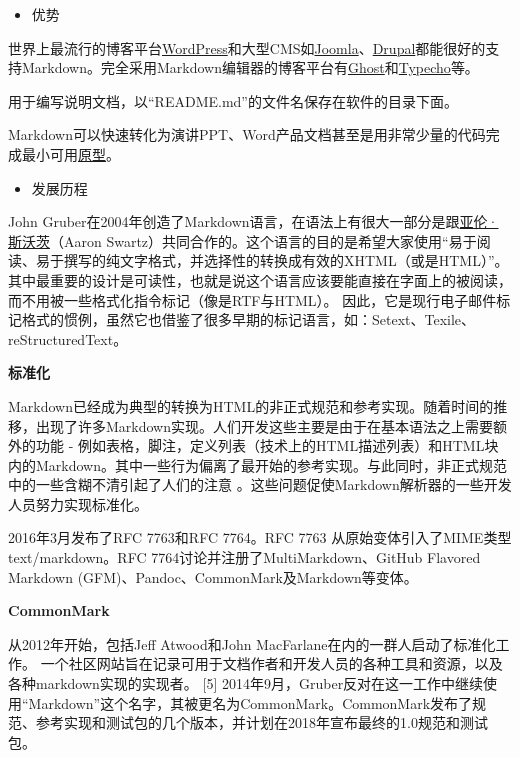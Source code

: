 \documentclass[
]{article}
\begin{document}
\begin{itemize}
\item
  优势
\end{itemize}

世界上最流行的博客平台\href{https://baike.baidu.com/item/WordPress}{WordPress}和大型CMS如\href{https://baike.baidu.com/item/Joomla}{Joomla}、\href{https://baike.baidu.com/item/Drupal}{Drupal}都能很好的支持Markdown。完全采用Markdown编辑器的博客平台有\href{https://baike.baidu.com/item/Ghost/17013737}{Ghost}和\href{https://baike.baidu.com/item/Typecho}{Typecho}等。

用于编写说明文档，以``README.md''的文件名保存在软件的目录下面。

Markdown可以快速转化为演讲PPT、Word产品文档甚至是用非常少量的代码完成最小可用\href{https://baike.baidu.com/item/原型/4126307}{原型}。

\begin{itemize}
\item
  发展历程
\end{itemize}

John
Gruber在2004年创造了Markdown语言，在语法上有很大一部分是跟\href{https://baike.baidu.com/item/亚伦·斯沃茨/4027108}{亚伦·斯沃茨}（Aaron
Swartz）共同合作的。这个语言的目的是希望大家使用``易于阅读、易于撰写的纯文字格式，并选择性的转换成有效的XHTML（或是HTML）''。
其中最重要的设计是可读性，也就是说这个语言应该要能直接在字面上的被阅读，而不用被一些格式化指令标记（像是RTF与HTML）。
因此，它是现行电子邮件标记格式的惯例，虽然它也借鉴了很多早期的标记语言，如：Setext、Texile、reStructuredText。

\textbf{标准化}

Markdown已经成为典型的转换为HTML的非正式规范和参考实现。随着时间的推移，出现了许多Markdown实现。人们开发这些主要是由于在基本语法之上需要额外的功能
-
例如表格，脚注，定义列表（技术上的HTML描述列表）和HTML块内的Markdown。其中一些行为偏离了最开始的参考实现。与此同时，非正式规范中的一些含糊不清引起了人们的注意
。这些问题促使Markdown解析器的一些开发人员努力实现标准化。

2016年3月发布了RFC 7763和RFC 7764。RFC 7763 从原始变体引入了MIME类型
text/markdown。RFC 7764讨论并注册了MultiMarkdown、GitHub Flavored
Markdown (GFM)、Pandoc、CommonMark及Markdown等变体。

\textbf{CommonMark}

从2012年开始，包括Jeff Atwood和John
MacFarlane在内的一群人启动了标准化工作。
一个社区网站旨在记录可用于文档作者和开发人员的各种工具和资源，以及各种markdown实现的实现者。
{[}5{]}
2014年9月，Gruber反对在这一工作中继续使用``Markdown''这个名字，其被更名为CommonMark。CommonMark发布了规范、参考实现和测试包的几个版本，并计划在2018年宣布最终的1.0规范和测试包。
\end{document}
